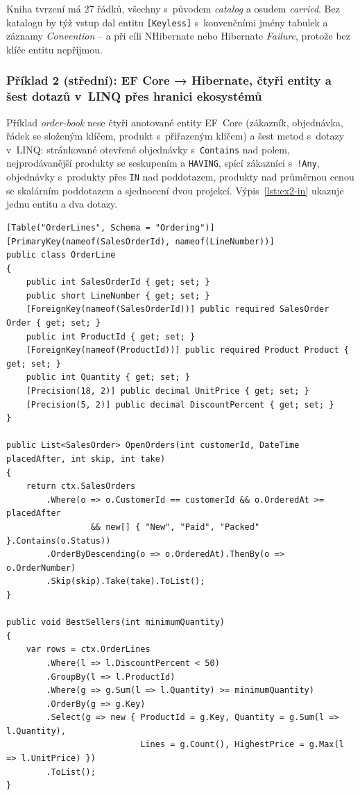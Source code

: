 \documentclass{article}
\begin{document}
Kniha tvrzení má 27 řádků, všechny s~původem \emph{catalog} a osudem \emph{carried}. Bez katalogu by týž vstup dal entitu \texttt{[Keyless]} s~konvenčními jmény tabulek a záznamy \emph{Convention} -- a při cíli NHibernate nebo Hibernate \emph{Failure}, protože bez klíče entitu nepřijmou.

\subsubsection*{Příklad 2 (střední): EF Core → Hibernate, čtyři entity a šest dotazů v~LINQ přes hranici ekosystémů}

Příklad \emph{order-book} nese čtyři anotované entity EF~Core (zákazník, objednávka, řádek se složeným klíčem, produkt s~přiřazeným klíčem) a šest metod s~dotazy v~LINQ: stránkované otevřené objednávky s~\texttt{Contains} nad polem, nejprodávanější produkty se seskupením a \texttt{HAVING}, spící zákazníci s~\texttt{!Any}, objednávky s~produkty přes \texttt{IN} nad poddotazem, produkty nad průměrnou cenou se skalárním poddotazem a sjednocení dvou projekcí. Výpis~\ref{lst:ex2-in} ukazuje jednu entitu a dva dotazy.

\begin{lstlisting}[language={[Sharp]C},caption={Příklad 2, vstup (výběr): \texttt{OrderLine.cs}, \texttt{OpenOrders.cs}, \texttt{BestSellers.cs}.},label={lst:ex2-in}]
[Table("OrderLines", Schema = "Ordering")]
[PrimaryKey(nameof(SalesOrderId), nameof(LineNumber))]
public class OrderLine
{
    public int SalesOrderId { get; set; }
    public short LineNumber { get; set; }
    [ForeignKey(nameof(SalesOrderId))] public required SalesOrder Order { get; set; }
    public int ProductId { get; set; }
    [ForeignKey(nameof(ProductId))] public required Product Product { get; set; }
    public int Quantity { get; set; }
    [Precision(18, 2)] public decimal UnitPrice { get; set; }
    [Precision(5, 2)] public decimal DiscountPercent { get; set; }
}

public List<SalesOrder> OpenOrders(int customerId, DateTime placedAfter, int skip, int take)
{
    return ctx.SalesOrders
        .Where(o => o.CustomerId == customerId && o.OrderedAt >= placedAfter
                 && new[] { "New", "Paid", "Packed" }.Contains(o.Status))
        .OrderByDescending(o => o.OrderedAt).ThenBy(o => o.OrderNumber)
        .Skip(skip).Take(take).ToList();
}

public void BestSellers(int minimumQuantity)
{
    var rows = ctx.OrderLines
        .Where(l => l.DiscountPercent < 50)
        .GroupBy(l => l.ProductId)
        .Where(g => g.Sum(l => l.Quantity) >= minimumQuantity)
        .OrderBy(g => g.Key)
        .Select(g => new { ProductId = g.Key, Quantity = g.Sum(l => l.Quantity),
                           Lines = g.Count(), HighestPrice = g.Max(l => l.UnitPrice) })
        .ToList();
}
\end{lstlisting}
\end{document}
